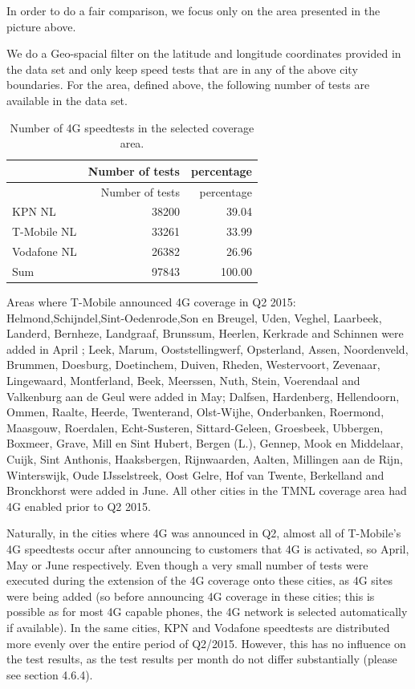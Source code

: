 \documentclass[]{article}
\begin{document}
In order to do a fair comparison, we focus only on the area presented in
the picture above.

We do a Geo-spacial filter on the latitude and longitude coordinates
provided in the data set and only keep speed tests that are in any of
the above city boundaries. For the area, defined above, the following
number of tests are available in the data set.

\begin{longtable}[c]{@{}lrr@{}}
\caption{Number of 4G speedtests in the selected coverage
area.}\tabularnewline
\toprule
& Number of tests & percentage\tabularnewline
\midrule
\endfirsthead
\toprule
& Number of tests & percentage\tabularnewline
\midrule
\endhead
KPN NL & 38200 & 39.04\tabularnewline
T-Mobile NL & 33261 & 33.99\tabularnewline
Vodafone NL & 26382 & 26.96\tabularnewline
Sum & 97843 & 100.00\tabularnewline
\bottomrule
\end{longtable}

Areas where T-Mobile announced 4G coverage in Q2 2015:
Helmond,Schijndel,Sint-Oedenrode,Son en Breugel, Uden, Veghel, Laarbeek,
Landerd, Bernheze, Landgraaf, Brunssum, Heerlen, Kerkrade and Schinnen
were added in April ; Leek, Marum, Ooststellingwerf, Opsterland, Assen,
Noordenveld, Brummen, Doesburg, Doetinchem, Duiven, Rheden, Westervoort,
Zevenaar, Lingewaard, Montferland, Beek, Meerssen, Nuth, Stein,
Voerendaal and Valkenburg aan de Geul were added in May; Dalfsen,
Hardenberg, Hellendoorn, Ommen, Raalte, Heerde, Twenterand, Olst-Wijhe,
Onderbanken, Roermond, Maasgouw, Roerdalen, Echt-Susteren,
Sittard-Geleen, Groesbeek, Ubbergen, Boxmeer, Grave, Mill en Sint
Hubert, Bergen (L.), Gennep, Mook en Middelaar, Cuijk, Sint Anthonis,
Haaksbergen, Rijnwaarden, Aalten, Millingen aan de Rijn, Winterswijk,
Oude IJsselstreek, Oost Gelre, Hof van Twente, Berkelland and
Bronckhorst were added in June. All other cities in the TMNL coverage
area had 4G enabled prior to Q2 2015.

Naturally, in the cities where 4G was announced in Q2, almost all of
T-Mobile's 4G speedtests occur after announcing to customers that 4G is
activated, so April, May or June respectively. Even though a very small
number of tests were executed during the extension of the 4G coverage
onto these cities, as 4G sites were being added (so before announcing 4G
coverage in these cities; this is possible as for most 4G capable
phones, the 4G network is selected automatically if available). In the
same cities, KPN and Vodafone speedtests are distributed more evenly
over the entire period of Q2/2015. However, this has no influence on the
test results, as the test results per month do not differ substantially
(please see section 4.6.4).
\end{document}
